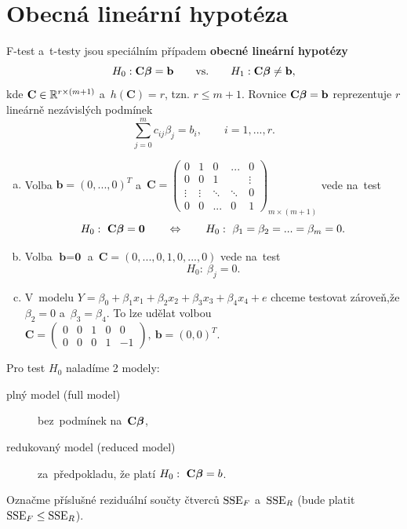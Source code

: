 \section{Obecná lineární hypotéza}
F-test a~t-testy jsou speciálním případem \textbf{obecné lineární hypotézy}
 $$ H_0: \textbf{C}\boldsymbol{\beta} = \textbf{b} \qquad\text{vs.}\qquad H_1: \textbf{C}\boldsymbol{\beta}\neq\textbf{b}, $$
kde $\textbf{C}\in\mathbb{R}^{r\times(m+1)}$ a~$h(\textbf{C}) = r$, tzn. $r\leq m+1$. Rovnice $\textbf{C}\boldsymbol{\beta} = \textbf{b}$ reprezentuje $r$ lineárně nezávislých podmínek
 $$ \sum_{j = 0}^m c_{ij}\beta_j = b_i,\qquad i = 1,...,r. $$
\begin{remark}
	\begin{enumerate}[a)]
		\item Volba $\textbf{b} = (0,...,0)^T$ a~$ \textbf{C} = \left(\begin{array}{c|cccc}
		0 & 1 & 0 &... & 0 \\\hline
		0 & 0 & 1 &  & \vdots \\
		\vdots& \vdots & \ddots & \ddots & 0 \\
		0 & 0 &... & 0 & 1
		\end{array}
		\right)_{m\times(m+1)} $ vede na~test
		 $$ H_0:~\textbf{C}\boldsymbol{\beta} = \textbf{0}\qquad\Leftrightarrow\qquad H_0:~\beta_1 = \beta_2 = ... = \beta_m = 0. $$
		\item Volba $\textbf{b} = \textbf{0}$ a~$\textbf{C} = (0,...,0,1,0,...,0)$ vede na~test
		 $$ H_0:~\beta_j = 0. $$
		\item V~modelu $Y = \beta_0+\beta_1x_1+\beta_2x_2+\beta_3x_3+\beta_4x_4+e$ chceme testovat zároveň,že $\beta_2 = 0$ a~$\beta_3 = \beta_4$. To lze udělat volbou $ \textbf{C} = \left(\begin{array}{ccccc}
		0 & 0 & 1 & 0 & 0 \\
		0 & 0 & 0 & 1 & -1
		\end{array}
		 \right),~\textbf{b} = (0,0)^T $.
	\end{enumerate}
\end{remark}

Pro test $H_0$ naladíme 2 modely:\begin{description}
\item[plný model (full model)] bez~podmínek na~$\textbf{C}\boldsymbol{\beta}$,
\item[redukovaný model (reduced model)] za~předpokladu, že platí $H_0:~\textbf{C}\boldsymbol{\beta} = b$.
\end{description}

Označme příslušné reziduální součty čtverců $\mathrm{SSE}_F$ a~$\mathrm{SSE}_R$ (bude platit $\mathrm{SSE}_F\leq\mathrm{SSE}_R$).

